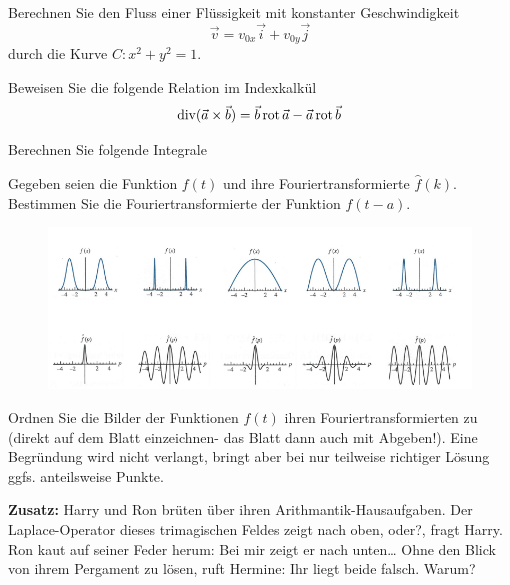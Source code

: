 \documentclass{atistandalonetask}
\begin{document}
\begin{atiTask}[
	title = Weitere Fragen
]
	\providecommand{\D}{\mathrm{d}}

\begin{atiSubtasks}
	\item Berechnen Sie den Fluss einer Flüssigkeit mit konstanter Geschwindigkeit 
	\[
	\vec{v}=v_{0x}\vec{i}+v_{0y}\vec{j}
	\]
	durch die Kurve $C: x^2+y^2=1$.
	\item Beweisen Sie die folgende Relation im Indexkalkül
	\[\operatorname{div}(\vec{a}\times\vec{b})=\vec{b}\operatorname{rot} \vec{a}-\vec{a}\operatorname{rot}\vec{b}
	\]
	\item Berechnen Sie folgende Integrale
	\begin{multicols}{2}
	\begin{atiSubequations}
		\item{}
		\item{}
	    \item{}
	    \item{}
	\end{atiSubequations}
	\end{multicols}
	\item Gegeben seien die Funktion $f(t)$ und ihre Fouriertransformierte $\hat{f}(k)$. Bestimmen Sie die Fouriertransformierte der Funktion $f(t-a)$.
	\begin{figure}[H]
\centering
\includegraphics[width=1\linewidth]{./picture-klausurss18}
\end{figure}

	\item Ordnen Sie die Bilder der Funktionen $f(t)$ ihren Fouriertransformierten zu (direkt auf dem Blatt einzeichnen- das Blatt dann auch mit Abgeben!). Eine Begründung wird nicht verlangt, bringt aber bei nur teilweise richtiger Lösung ggfs. anteilsweise Punkte. \\
	\item \textbf{Zusatz:} Harry und Ron brüten über ihren Arithmantik-Hausaufgaben. \glqq Der Laplace-Operator dieses trimagischen 
	Feldes zeigt nach oben, oder?\grqq{}, fragt Harry. Ron kaut auf seiner Feder herum: \glqq Bei mir zeigt er nach unten\dots\grqq{} Ohne den Blick von ihrem Pergament zu lösen, ruft Hermine: \glqq Ihr liegt beide falsch.\grqq{} Warum?
\end{atiSubtasks}

\end{atiTask}
\end{document}

